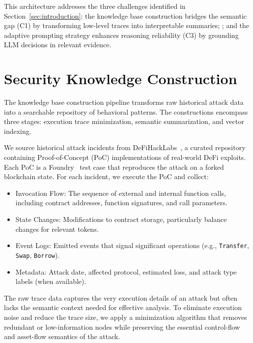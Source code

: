This architecture addresses the three challenges identified in Section~\ref{sec:introduction}: the knowledge base construction bridges the semantic gap (C1) by transforming low-level traces into interpretable summaries; ; and the adaptive prompting strategy enhances reasoning reliability (C3) by grounding LLM decisions in relevant evidence.

\section{Security Knowledge Construction}
\label{sec:knowledge-base}

The knowledge base construction pipeline transforms raw historical attack data into a searchable repository of behavioral patterns. The constructions encompass three stages: execution trace minimization, semantic summarization, and vector indexing.


We source historical attack incidents from DeFiHackLabs~\cite{defihacklabs2024}, a curated repository containing Proof-of-Concept (PoC) implementations of real-world DeFi exploits.  Each PoC is a Foundry~\cite{foundry} test case that reproduces the attack on a forked blockchain state. For each incident, we execute the PoC and collect:

\begin{itemize}
    \item Invocation Flow: The sequence of external and internal function calls, including contract addresses, function signatures, and call parameters.
    \item State Changes: Modifications to contract storage, particularly balance changes for relevant tokens.
    \item Event Logs: Emitted events that signal significant operations (e.g., \texttt{Transfer}, \texttt{Swap}, \texttt{Borrow}).
    \item Metadata: Attack date, affected protocol, estimated loss, and attack type labels (when available).
\end{itemize}

The raw trace data captures the very execution details of an attack but often lacks the semantic context needed for effective analysis. 
To eliminate execution noise and reduce the trace size, we apply a minimization algorithm that removes redundant or low-information nodes while preserving the essential control-flow and asset-flow semantics of the attack.

